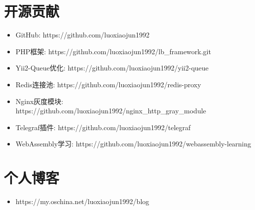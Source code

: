 \documentclass[a4paper,12pt]{article}
\begin{document}
\begin{CJK}{UTF8}{gbsn}
		\section{开源贡献}
		 	\begin{itemize}
				\item{GitHub: https://github.com/luoxiaojun1992}
				\item{PHP框架: https://github.com/luoxiaojun1992/lb\_framework.git}
				\item{Yii2-Queue优化: https://github.com/luoxiaojun1992/yii2-queue}
				\item{Redis连接池: https://github.com/luoxiaojun1992/redis-proxy}
				\item{Nginx灰度模块: https://github.com/luoxiaojun1992/nginx\_http\_gray\_module}
				\item{Telegraf插件: https://github.com/luoxiaojun1992/telegraf}
				\item{WebAssembly学习: https://github.com/luoxiaojun1992/webassembly-learning}
			\end{itemize}
		
		\section{个人博客}
			\begin{itemize}
				\item{https://my.oschina.net/luoxiaojun1992/blog}
			\end{itemize}

	\end{CJK}
\end{document}
